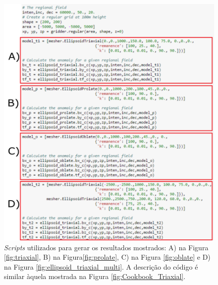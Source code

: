 \begin{figure}[hbt!]
	\centering \includegraphics[width=16 cm,height=20 cm]{figures/mag_fields_011}
	\caption[\textit{Scripts} utilizados para gerar os resultados mostrados: A) na Figura \ref{fig:triaxial}, B) na Figura \ref{fig:prolate}, C) na Figura \ref{fig:oblate} e D) na Figura \ref{fig:ellipsoid_triaxial_multi}. A descrição do código é similar àquela mostrada na Figura \ref{fig:Cookbook_Triaxial}.]{\textit{Scripts} utilizados para gerar os resultados mostrados: A) na Figura \ref{fig:triaxial}, B) na Figura\ref{fig:prolate}, C) na Figura \ref{fig:oblate} e D) na Figura \ref{fig:ellipsoid_triaxial_multi}. A descrição do código é similar àquela mostrada na Figura \ref{fig:Cookbook_Triaxial}.}
	\label{fig:mag_fields_0}
\end{figure}

